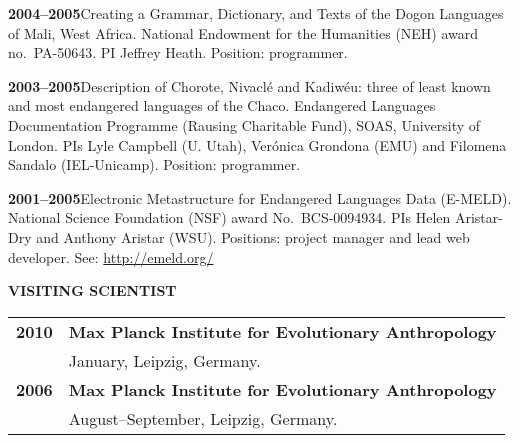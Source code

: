 \documentclass[11pt]{article}
\newcommand{\hangpara}{
 \setlength{\parindent}{0in} %
 \hangindent=0.42in %
}
\begin{document}
\vskip 6pt
\hangpara
{\bf 2004--2005}\hspace{1ex}Creating a Grammar, Dictionary, and Texts of the Dogon Languages of Mali, West Africa. National Endowment for the Humanities (NEH) award no.\ PA-50643. PI Jeffrey Heath. Position: programmer.

\vskip 6pt
\hangpara
{\bf 2003--2005}\hspace{1ex}Description of Chorote, Nivacl{\'e} and Kadiw{\'e}u: three of least known and most endangered languages of the Chaco. Endangered Languages Documentation Programme (Rausing Charitable Fund), SOAS, University of London. PIs Lyle Campbell (U. Utah), Ver{\'o}nica Grondona (EMU) and Filomena Sandalo (IEL-Unicamp). Position: programmer.


\vskip 6pt
\hangpara
{\bf 2001--2005}\hspace{1ex}Electronic Metastructure for Endangered Languages Data (E-MELD). National Science Foundation (NSF) award No.\ BCS-0094934. PIs Helen Aristar-Dry and Anthony Aristar (WSU). Positions: project manager and lead web developer. See: \url{http://emeld.org/}

\vskip 20pt
\begin{flushleft}
{\bf VISITING SCIENTIST}
\end{flushleft}
\begin{tabular}{lp{5.5in}}
\bf 2010	& {\bf Max Planck Institute for Evolutionary Anthropology}\\
& January, Leipzig, Germany.  \\
\bf 2006	& {\bf Max Planck Institute for Evolutionary Anthropology}\\
& August--September, Leipzig, Germany.  \\
\end{tabular}


\newpage
\end{document}
